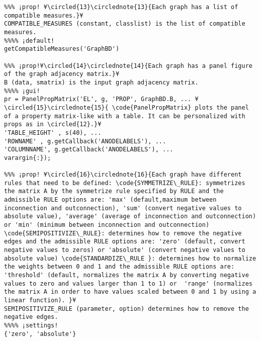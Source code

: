 \documentclass{tufte-handout}
\begin{document}
\begin{lstlisting}
%%% ¡prop! ¥\circled{13}\circlednote{13}{Each graph has a list of compatible measures.}¥
COMPATIBLE_MEASURES (constant, classlist) is the list of compatible measures.
%%%% ¡default!
getCompatibleMeasures('GraphBD')

%%% ¡prop!¥\circled{14}\circlednote{14}{Each graph has a panel figure of the graph adjacency matrix.}¥
B (data, smatrix) is the input graph adjacency matrix.
%%%% ¡gui!
pr = PanelPropMatrix('EL', g, 'PROP', GraphBD.B, ... ¥\circled{15}\circlednote{15}{ \code{PanelPropMatrix} plots the panel of a property matrix-like with a table. It can be personalized with props as in \circled{12}.}¥
'TABLE_HEIGHT' , s(40), ...
'ROWNAME' , g.getCallback('ANODELABELS'), ... 
'COLUMNNAME', g.getCallback('ANODELABELS'), ...
varargin{:});

%%% ¡prop! ¥\circled{16}\circlednote{16}{Each graph have different rules that need to be defined: \code{SYMMETRIZE\_RULE}: symmetrizes the matrix A by the symmetrize rule specified by RULE and the admissible RULE options are: 'max' (default,maximum between inconnection and outconnection), 'sum' (convert negative values to absolute value), 'average' (average of inconnection and outconnection) or 'min' (minimum between inconnection and outconnection) \code{SEMIPOSITIVIZE\_RULE}: determines how to remove the negative edges and the admissible RULE options are: 'zero' (default, convert negative values to zeros) or 'absolute' (convert negative values to absolute value) \code{STANDARDIZE\_RULE }: determines how to normalize the weights between 0 and 1 and the admissible RULE options are: 'threshold' (default, normalizes the matrix A by converting negative values to zero and values larger than 1 to 1) or  'range' (normalizes the matrix A in order to have values scaled between 0 and 1 by using a linear function). }¥
SEMIPOSITIVIZE_RULE (parameter, option) determines how to remove the negative edges.
%%%% ¡settings!
{'zero', 'absolute'}

\end{lstlisting}

\clearpage
\end{document}
